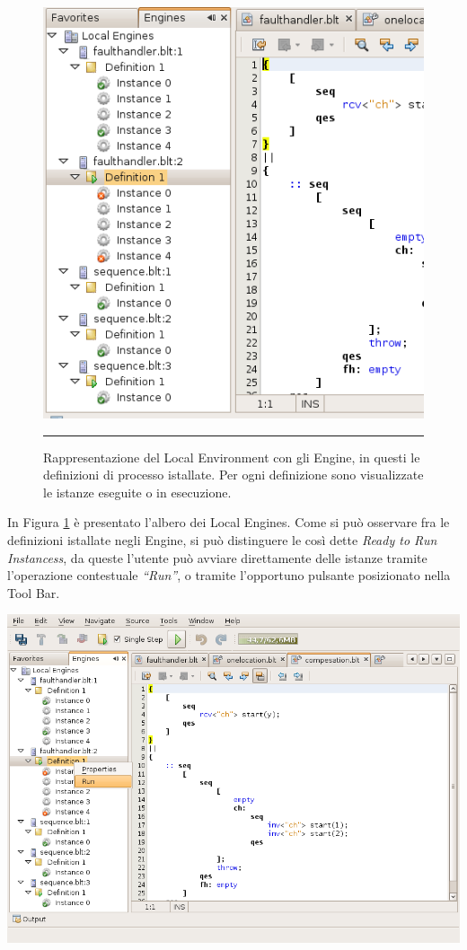 \begin{figure}[t]
\begin{center}
\includegraphics[scale=0.65]
{blide/dia/BlideEngines}
\caption[Blide, feedback alla compilazione]{Rappresentazione del Local
Environment con gli Engine, in questi le definizioni di processo istallate. Per
ogni definizione sono visualizzate le istanze eseguite o in esecuzione.}
\rule{7cm}{0.01cm}
  \label{fig:blidEngines}
\end{center}
\end{figure}

In Figura \ref{fig:blidEngines} è presentato l'albero dei Local Engines.
Come si può osservare fra le definizioni istallate negli Engine, si può
distinguere le così dette \emph{Ready to Run Instancess}, da queste l'utente
può avviare direttamente delle istanze tramite l'operazione contestuale
\emph{``Run''}, o tramite l'opportuno pulsante posizionato nella Tool Bar.

\begin{center}
\includegraphics[scale=0.65]{blide/dia/BlideRunInst}
\end{center}

